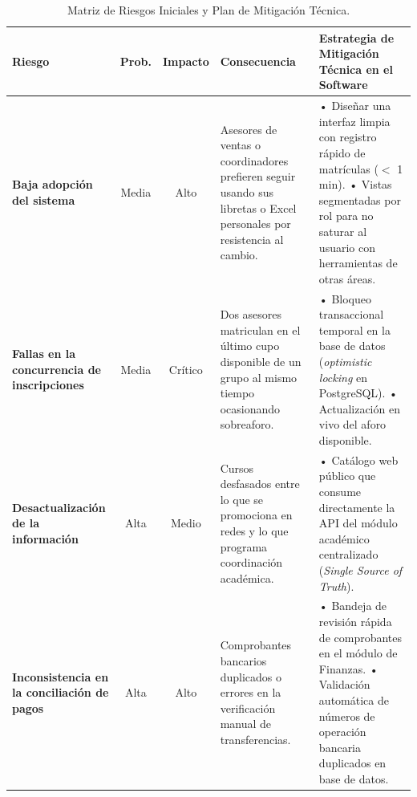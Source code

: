 \documentclass[11pt,a4paper]{article}
\begin{document}
\begin{table}[H]
    \centering
    \small
    \begin{tabularx}{\textwidth}{@{}p{3.2cm}ccXX@{}}
        \toprule
        \textbf{Riesgo} & \textbf{Prob.} & \textbf{Impacto} & \textbf{Consecuencia} & \textbf{Estrategia de Mitigación Técnica en el Software} \\
        \midrule
        \textbf{Baja adopción del sistema} & Media & Alto & Asesores de ventas o coordinadores prefieren seguir usando sus libretas o Excel personales por resistencia al cambio. & 
        • Diseñar una interfaz limpia con registro rápido de matrículas ($<$ 1 min).\newline
        • Vistas segmentadas por rol para no saturar al usuario con herramientas de otras áreas. \\
        \midrule
        \textbf{Fallas en la concurrencia de inscripciones} & Media & Crítico & Dos asesores matriculan en el último cupo disponible de un grupo al mismo tiempo ocasionando sobreaforo. & 
        • Bloqueo transaccional temporal en la base de datos (\textit{optimistic locking} en PostgreSQL).\newline
        • Actualización en vivo del aforo disponible. \\
        \midrule
        \textbf{Desactualización de la información} & Alta & Medio & Cursos desfasados entre lo que se promociona en redes y lo que programa coordinación académica. & 
        • Catálogo web público que consume directamente la API del módulo académico centralizado (\textit{Single Source of Truth}). \\
        \midrule
        \textbf{Inconsistencia en la conciliación de pagos} & Alta & Alto & Comprobantes bancarios duplicados o errores en la verificación manual de transferencias. & 
        • Bandeja de revisión rápida de comprobantes en el módulo de Finanzas.\newline
        • Validación automática de números de operación bancaria duplicados en base de datos. \\
        \bottomrule
    \end{tabularx}
    \caption{Matriz de Riesgos Iniciales y Plan de Mitigación Técnica.}
\end{table}

\end{document}
